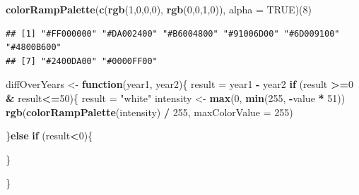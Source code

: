 \documentclass[
]{article}
\newenvironment{Shaded}{\begin{snugshade}}{\end{snugshade}}
\newcommand{\AttributeTok}[1]{\textcolor[rgb]{0.13,0.29,0.53}{#1}}
\newcommand{\ConstantTok}[1]{\textcolor[rgb]{0.56,0.35,0.01}{#1}}
\newcommand{\ControlFlowTok}[1]{\textcolor[rgb]{0.13,0.29,0.53}{\textbf{#1}}}
\newcommand{\DecValTok}[1]{\textcolor[rgb]{0.00,0.00,0.81}{#1}}
\newcommand{\FunctionTok}[1]{\textcolor[rgb]{0.13,0.29,0.53}{\textbf{#1}}}
\newcommand{\NormalTok}[1]{#1}
\newcommand{\OtherTok}[1]{\textcolor[rgb]{0.56,0.35,0.01}{#1}}
\newcommand{\SpecialCharTok}[1]{\textcolor[rgb]{0.81,0.36,0.00}{\textbf{#1}}}
\newcommand{\StringTok}[1]{\textcolor[rgb]{0.31,0.60,0.02}{#1}}
\begin{document}
\begin{Shaded}
\begin{Highlighting}[]
\FunctionTok{colorRampPalette}\NormalTok{(}\FunctionTok{c}\NormalTok{(}\FunctionTok{rgb}\NormalTok{(}\DecValTok{1}\NormalTok{,}\DecValTok{0}\NormalTok{,}\DecValTok{0}\NormalTok{,}\DecValTok{0}\NormalTok{), }\FunctionTok{rgb}\NormalTok{(}\DecValTok{0}\NormalTok{,}\DecValTok{0}\NormalTok{,}\DecValTok{1}\NormalTok{,}\DecValTok{0}\NormalTok{)), }\AttributeTok{alpha =} \ConstantTok{TRUE}\NormalTok{)(}\DecValTok{8}\NormalTok{)}
\end{Highlighting}
\end{Shaded}

\begin{verbatim}
## [1] "#FF000000" "#DA002400" "#B6004800" "#91006D00" "#6D009100" "#4800B600"
## [7] "#2400DA00" "#0000FF00"
\end{verbatim}

\begin{Shaded}
\begin{Highlighting}[]
\NormalTok{diffOverYears }\OtherTok{\textless{}{-}} \ControlFlowTok{function}\NormalTok{(year1, year2)\{}
\NormalTok{    result }\OtherTok{=}\NormalTok{ year1 }\SpecialCharTok{{-}}\NormalTok{ year2}
    \ControlFlowTok{if}\NormalTok{ (result }\SpecialCharTok{\textgreater{}=}\DecValTok{0} \SpecialCharTok{\&}\NormalTok{ result}\SpecialCharTok{\textless{}=}\DecValTok{50}\NormalTok{)\{}
\NormalTok{        result }\OtherTok{=} \StringTok{"white"}
\NormalTok{        intensity }\OtherTok{\textless{}{-}} \FunctionTok{max}\NormalTok{(}\DecValTok{0}\NormalTok{, }\FunctionTok{min}\NormalTok{(}\DecValTok{255}\NormalTok{, }\SpecialCharTok{{-}}\NormalTok{value }\SpecialCharTok{*} \DecValTok{51}\NormalTok{))}
        \FunctionTok{rgb}\NormalTok{(}\FunctionTok{colorRampPalette}\NormalTok{(intensity) }\SpecialCharTok{/} \DecValTok{255}\NormalTok{, }\AttributeTok{maxColorValue =} \DecValTok{255}\NormalTok{)}

\NormalTok{    \}}\ControlFlowTok{else} \ControlFlowTok{if}\NormalTok{ (result}\SpecialCharTok{\textless{}}\DecValTok{0}\NormalTok{)\{}

\NormalTok{    \}}
        
\NormalTok{    \}}
\end{Highlighting}
\end{Shaded}
\end{document}

